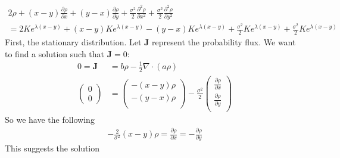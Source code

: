 \documentclass[12pt]{article}
\theoremstyle{plain}
\theoremstyle{definition}
\theoremstyle{remark}
\begin{document}
\begin{enumerate}
\begin{enumerate}
\begin{align*}
          2\rho + (x-y)\frac{\partial\rho}{\partial x}
          + (y-x)\frac{\partial\rho}{\partial y}
          + \frac{\sigma^2 }{2} \frac{\partial^2 \rho}{\partial x^2}
          + \frac{\sigma^2 }{2} \frac{\partial^2 \rho}{\partial y^2} \\
          =
          2K e^{\lambda (x-y)}
          + (x-y)K e^{\lambda (x-y)}
          - (y-x)K e^{\lambda (x-y)}
          + \frac{\sigma^2 }{2}K e^{\lambda (x-y)}
          + \frac{\sigma^2 }{2}K e^{\lambda (x-y)}
        \end{align*}
        First, the stationary distribution. Let $\mathbf{J}$ represent
        the probability flux. We want to find a solution such that
        $\mathbf{J}=0$:
        \begin{align*}
          0 = \mathbf{J} &= b\rho - \frac{1}{2}\nabla\cdot(a\rho)\\
          \begin{pmatrix}
            0 \\ 0
          \end{pmatrix}
          &=
          \begin{pmatrix}
            -(x-y) \rho \\
            -(y-x) \rho \\
          \end{pmatrix}
          - \frac{\sigma^2}{2}
          \begin{pmatrix}
            \frac{\partial \rho}{\partial x} \\
            \frac{\partial \rho}{\partial y} \\
          \end{pmatrix}
        \end{align*}
        So we have the following
        \begin{align*}
          -\frac{2}{\sigma^2} (x-y) \rho
          = \frac{\partial \rho}{\partial x}
          = -\frac{\partial \rho}{\partial y}
        \end{align*}
        This suggests the solution 
    \end{enumerate}


\end{enumerate}
\end{document}
